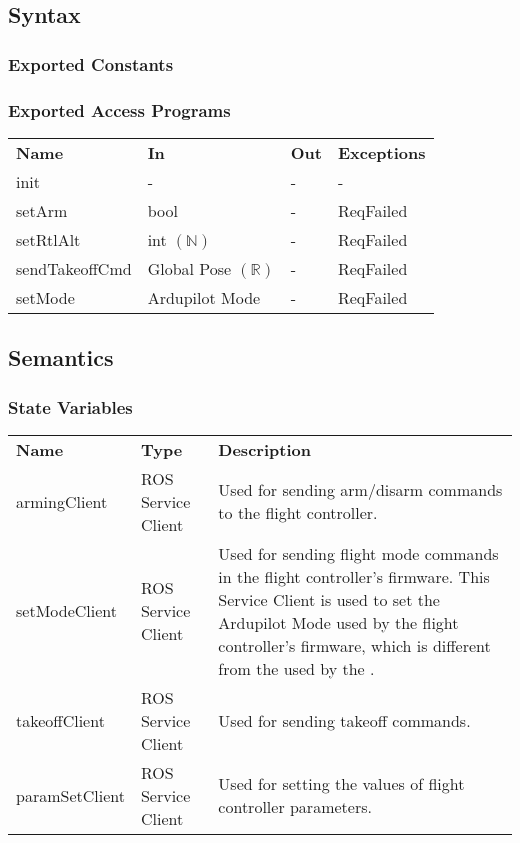 \documentclass[12pt, titlepage]{article}
\begin{document}
\subsection{Syntax}
\subsubsection{Exported Constants}
\subsubsection{Exported Access Programs}
\begin{center}
\begin{tabular}{p{3.5cm} p{2.5cm} p{2.5cm} p{5cm}}
\hline
\textbf{Name} & \textbf{In} & \textbf{Out} & \textbf{Exceptions} \\
init & - & - & - \\
setArm & bool & - & ReqFailed \\
setRtlAlt & int $(\mathbb{N})$ & - & ReqFailed \\
sendTakeoffCmd & Global Pose $(\mathbb{R})$ & - & ReqFailed \\
setMode & Ardupilot Mode & - & ReqFailed \\
\hline
\hline
\end{tabular}
\end{center}
\subsection{Semantics}
\subsubsection{State Variables}
\begin{center}
\begin{tabular}{p{3 cm} p{4cm} p{9cm} }
\hline
\textbf{Name} & \textbf{Type} & \textbf{Description}  \\
armingClient & ROS Service Client & Used for sending arm/disarm commands to the flight controller. \\
setModeClient & ROS Service Client & Used for sending flight mode commands in the flight controller's firmware. This Service Client is used to set the Ardupilot Mode used by the flight controller's firmware, which is different from the \nameref{Operation States} used by the \nameref{Operations Manager}.  \\
takeoffClient & ROS Service Client & Used for sending takeoff commands. \\
paramSetClient & ROS Service Client & Used for setting the values of flight controller parameters. \\
\hline
\hline
\end{tabular}
\end{center}
\end{document}
